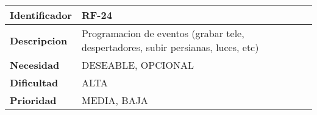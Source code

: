 \begin{center}
    \begin{tabular}{|p{2.6cm}|p{12cm}|}
    \hline
    \textbf{Identificador} & RF-24\\
    \hline
    \textbf{Descripcion} & Programacion de eventos (grabar tele, despertadores, subir persianas, luces, etc)\\
    \hline
    \textbf{Necesidad} & DESEABLE, OPCIONAL\\
    \hline
    \textbf{Dificultad} & ALTA\\
    \hline
    \textbf{Prioridad} & MEDIA, BAJA\\
    \hline
    \end{tabular}
\end{center}
